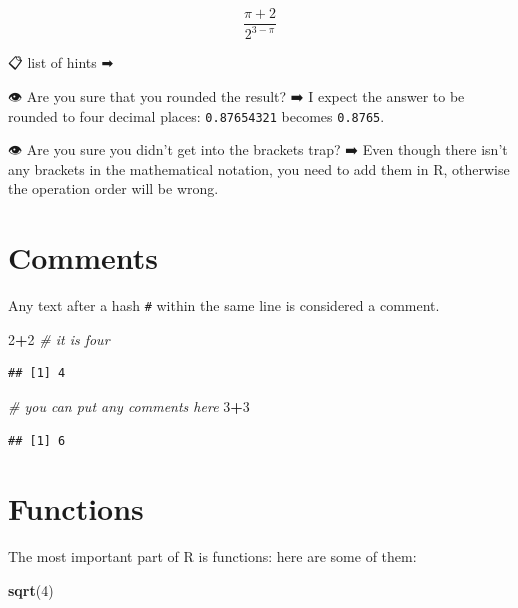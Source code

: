 \documentclass[
]{book}
\newenvironment{Shaded}{\begin{snugshade}}{\end{snugshade}}
\newcommand{\CommentTok}[1]{\textcolor[rgb]{0.56,0.35,0.01}{\textit{#1}}}
\newcommand{\DecValTok}[1]{\textcolor[rgb]{0.00,0.00,0.81}{#1}}
\newcommand{\KeywordTok}[1]{\textcolor[rgb]{0.13,0.29,0.53}{\textbf{#1}}}
\newcommand{\NormalTok}[1]{#1}
\newcommand{\OperatorTok}[1]{\textcolor[rgb]{0.81,0.36,0.00}{\textbf{#1}}}
\begin{document}
\[\frac{\pi+2}{2^{3-\pi}}\]

📋 list of hints ➡

👁 Are you sure that you rounded the result? ➡
I expect the answer to be rounded to four decimal places: \texttt{0.87654321} becomes \texttt{0.8765}.

👁 Are you sure you didn't get into the brackets trap? ➡
Even though there isn't any brackets in the mathematical notation, you need to add them in R, otherwise the operation order will be wrong.

\hypertarget{comments}{%
\section{Comments}\label{comments}}

Any text after a hash \texttt{\#} within the same line is considered a comment.

\begin{Shaded}
\begin{Highlighting}[]
\DecValTok{2}\OperatorTok{+}\DecValTok{2} \CommentTok{# it is four}
\end{Highlighting}
\end{Shaded}

\begin{verbatim}
## [1] 4
\end{verbatim}

\begin{Shaded}
\begin{Highlighting}[]
\CommentTok{# you can put any comments here}
\DecValTok{3}\OperatorTok{+}\DecValTok{3}
\end{Highlighting}
\end{Shaded}

\begin{verbatim}
## [1] 6
\end{verbatim}

\hypertarget{functions}{%
\section{Functions}\label{functions}}

The most important part of R is functions: here are some of them:

\begin{Shaded}
\begin{Highlighting}[]
\KeywordTok{sqrt}\NormalTok{(}\DecValTok{4}\NormalTok{)}
\end{Highlighting}
\end{Shaded}
\end{document}

